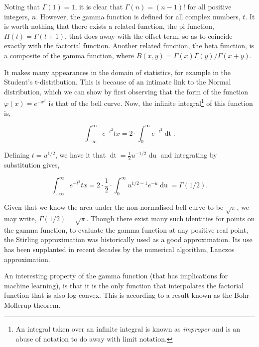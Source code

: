 \documentclass[11pt]{amsart}
\begin{document}
Noting that $\Gamma(1) = 1$, it is clear that $\Gamma(n) = (n - 1)!$ for all positive integers, $n$. However, the gamma function is defined for all complex numbers, $t$. It is worth nothing that there exists a related function, the pi function, $\Pi(t) = \Gamma(t + 1)$, that does away with the offset term, so as to coincide exactly with the factorial function. Another related function, the beta function, is a composite of the gamma function, where $B(x, y) = \Gamma(x)\Gamma(y)/\Gamma(x+y)$.

It makes many appearances in the domain of statistics, for example in the Student's t-distribution. This is because of an intimate link to the Normal distribution, which we can show by first observing that the form of the function $\varphi(x) = e^{-x^2}$ is that of the bell curve. Now, the infinite integral\footnote{An integral taken over an infinite integral is known as \emph{improper} and is an abuse of notation to do away with limit notation.} of this function is,

$$\int_{-\infty}^{\infty} e^{-t^2} tx = 2\cdot\int_{0}^{\infty} e^{-t^2} \mathop{dt}.$$

Defining $t = u^{1/2}$, we have it that $\mathop{dt} = \frac{1}{2}u^{-1/2}\mathop{du}$ and integrating by substitution gives,

$$\int_{-\infty}^{\infty} e^{-t^2} tx = 2\cdot\frac{1}{2}\cdot\int_{0}^{\infty}u^{1/2 - 1} e^{-u}\mathop{du} = \Gamma(1/2).$$

Given that we know the area under the non-normalised bell curve to be $\sqrt{\pi}$, we may write, $\Gamma(1/2) = \sqrt{\pi}$. Though there exist many such identities for points on the gamma function, to evaluate the gamma function at any positive real point, the Stirling approximation was historically used as a good approximation. Its use has been supplanted in recent decades by the numerical algorithm, Lanczos approximation.

An interesting property of the gamma function (that has implications for machine learning), is that it is the only function that interpolates the factorial function that is also log-convex. This is according to a result known as the Bohr-Mollerup theorem.
\end{document}
